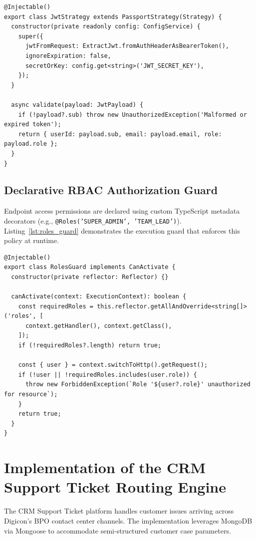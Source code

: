\begin{lstlisting}[caption={Stateless JWT Verification Strategy.}, label={lst:jwt_strategy}]
@Injectable()
export class JwtStrategy extends PassportStrategy(Strategy) {
  constructor(private readonly config: ConfigService) {
    super({
      jwtFromRequest: ExtractJwt.fromAuthHeaderAsBearerToken(),
      ignoreExpiration: false,
      secretOrKey: config.get<string>('JWT_SECRET_KEY'),
    });
  }

  async validate(payload: JwtPayload) {
    if (!payload?.sub) throw new UnauthorizedException('Malformed or expired token');
    return { userId: payload.sub, email: payload.email, role: payload.role };
  }
}
\end{lstlisting}

\subsection{Declarative RBAC Authorization Guard}
Endpoint access permissions are declared using custom TypeScript metadata decorators (e.g., \texttt{@Roles('SUPER\_ADMIN', 'TEAM\_LEAD')}). Listing~\ref{lst:roles_guard} demonstrates the execution guard that enforces this policy at runtime.

\begin{lstlisting}[caption={Role-Based Access Control (RBAC) Guard.}, label={lst:roles_guard}]
@Injectable()
export class RolesGuard implements CanActivate {
  constructor(private reflector: Reflector) {}

  canActivate(context: ExecutionContext): boolean {
    const requiredRoles = this.reflector.getAllAndOverride<string[]>('roles', [
      context.getHandler(), context.getClass(),
    ]);
    if (!requiredRoles?.length) return true;

    const { user } = context.switchToHttp().getRequest();
    if (!user || !requiredRoles.includes(user.role)) {
      throw new ForbiddenException(`Role '${user?.role}' unauthorized for resource`);
    }
    return true;
  }
}
\end{lstlisting}

\section{Implementation of the CRM Support Ticket Routing Engine}
\label{sec:impl_crm}

The CRM Support Ticket platform handles customer issues arriving across Digicon's BPO contact center channels. The implementation leverages MongoDB via Mongoose to accommodate semi-structured customer case parameters.

